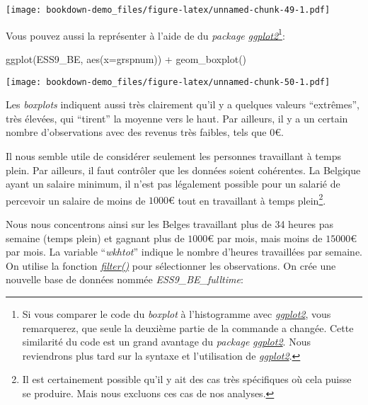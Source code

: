 \documentclass[
]{book}
\newenvironment{Shaded}{\begin{snugshade}}{\end{snugshade}}
\newcommand{\AttributeTok}[1]{\textcolor[rgb]{0.77,0.63,0.00}{#1}}
\newcommand{\FunctionTok}[1]{\textcolor[rgb]{0.00,0.00,0.00}{#1}}
\newcommand{\NormalTok}[1]{#1}
\newcommand{\SpecialCharTok}[1]{\textcolor[rgb]{0.00,0.00,0.00}{#1}}
\begin{document}
\texttt{[image: bookdown-demo\_files/figure-latex/unnamed-chunk-49-1.pdf]}

Vous pouvez aussi la représenter à l'aide de du \emph{package} \href{https://ggplot2.tidyverse.org/}{\emph{ggplot2}}\footnote{Si vous comparer le code du \emph{boxplot} à l'histogramme avec \href{https://ggplot2.tidyverse.org/}{\emph{ggplot2}}, vous remarquerez, que seule la deuxième partie de la commande a changée. Cette similarité du code est un grand avantage du \emph{package} \href{https://ggplot2.tidyverse.org/}{\emph{ggplot2}}. Nous reviendrons plus tard sur la syntaxe et l'utilisation de \href{https://ggplot2.tidyverse.org/}{\emph{ggplot2}}.}:

\begin{Shaded}
\begin{Highlighting}[]
\FunctionTok{ggplot}\NormalTok{(ESS9\_BE, }\FunctionTok{aes}\NormalTok{(}\AttributeTok{x=}\NormalTok{grspnum)) }\SpecialCharTok{+}
  \FunctionTok{geom\_boxplot}\NormalTok{()}
\end{Highlighting}
\end{Shaded}

\texttt{[image: bookdown-demo\_files/figure-latex/unnamed-chunk-50-1.pdf]}

Les \emph{boxplots} indiquent aussi très clairement qu'il y a quelques valeurs ``extrêmes'', très élevées, qui ``tirent'' la moyenne vers le haut. Par ailleurs, il y a un certain nombre d'observations avec des revenus très faibles, tels que \(0€\).

Il nous semble utile de considérer seulement les personnes travaillant à temps plein. Par ailleurs, il faut contrôler que les données soient cohérentes. La Belgique ayant un salaire minimum, il n'est pas légalement possible pour un salarié de percevoir un salaire de moins de \(1000€\) tout en travaillant à temps plein\footnote{Il est certainement possible qu'il y ait des cas très spécifiques où cela puisse se produire. Mais nous excluons ces cas de nos analyses.}.

Nous nous concentrons ainsi sur les Belges travaillant plus de 34 heures pas semaine (temps plein) et gagnant plus de \(1000€\) par mois, mais moins de \(15000€\) par mois. La variable ``\emph{wkhtot}'' indique le nombre d'heures travaillées par semaine. On utilise la fonction \href{https://dplyr.tidyverse.org/reference/filter.html}{\emph{filter()}} pour sélectionner les observations. On crée une nouvelle base de données nommée \emph{ESS9\_BE\_fulltime}:
\end{document}
